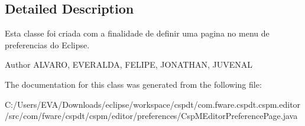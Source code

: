 \subsection{Detailed Description}
Esta classe foi criada com a finalidade de definir uma pagina no menu de preferencias do Eclipse. 

\begin{DoxyAuthor}{Author}
A\+L\+V\+A\+RO, E\+V\+E\+R\+A\+L\+DA, F\+E\+L\+I\+PE, J\+O\+N\+A\+T\+H\+AN, J\+U\+V\+E\+N\+AL 
\end{DoxyAuthor}


The documentation for this class was generated from the following file\+:\begin{DoxyCompactItemize}
\item 
C\+:/\+Users/\+E\+V\+A/\+Downloads/eclipse/workspace/cspdt/com.\+fware.\+cspdt.\+cspm.\+editor/src/com/fware/cspdt/cspm/editor/preferences/Csp\+M\+Editor\+Preference\+Page.\+java\end{DoxyCompactItemize}
